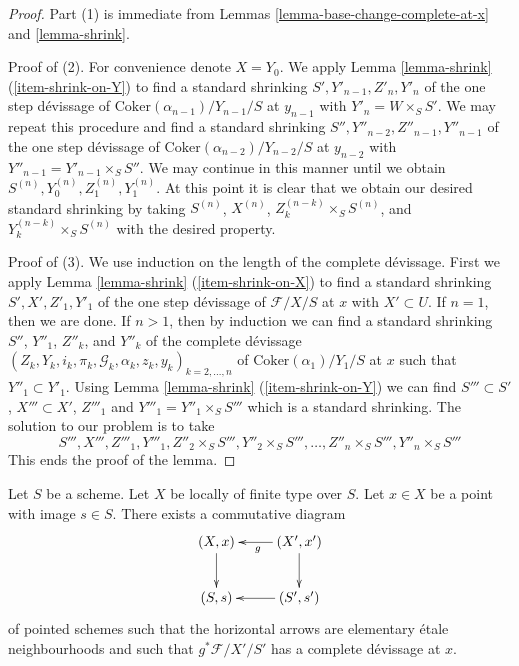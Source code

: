 \begin{proof}
Part (1) is immediate from
Lemmas \ref{lemma-base-change-complete-at-x} and
\ref{lemma-shrink}.

\medskip\noindent
Proof of (2). For convenience denote $X = Y_0$. We apply
Lemma \ref{lemma-shrink} (\ref{item-shrink-on-Y})
to find a standard shrinking
$S', Y'_{n - 1}, Z'_n, Y'_n$
of the one step d\'evissage of $\text{Coker}(\alpha_{n - 1})/Y_{n - 1}/S$
at $y_{n - 1}$ with $Y'_n = W \times_S S'$. We may repeat this procedure
and find a standard shrinking
$S'', Y''_{n - 2}, Z''_{n - 1}, Y''_{n - 1}$
of the one step d\'evissage of $\text{Coker}(\alpha_{n - 2})/Y_{n - 2}/S$
at $y_{n - 2}$ with $Y''_{n - 1} = Y'_{n - 1} \times_S S''$.
We may continue in this manner until we obtain
$S^{(n)}, Y^{(n)}_0, Z^{(n)}_1, Y^{(n)}_1$.
At this point it is clear that we obtain our desired standard shrinking
by taking $S^{(n)}$, $X^{(n)}$, $Z_k^{(n - k)} \times_S S^{(n)}$, and
$Y_k^{(n - k)} \times_S S^{(n)}$ with the desired property.

\medskip\noindent
Proof of (3). We use induction on the length of the complete
d\'evissage. First we apply
Lemma \ref{lemma-shrink} (\ref{item-shrink-on-X})
to find a standard shrinking
$S', X', Z'_1, Y'_1$ 
of the one step d\'evissage of $\mathcal{F}/X/S$ at $x$
with $X' \subset U$. If $n = 1$, then we are done.
If $n > 1$, then by induction we can find a standard shrinking
$S''$, $Y''_1$, $Z''_k$, and $Y''_k$ of the complete d\'evissage
$(Z_k, Y_k, i_k, \pi_k, \mathcal{G}_k, \alpha_k, z_k, y_k)_{k = 2, \ldots, n}$
of $\text{Coker}(\alpha_1)/Y_1/S$ at $x$ such that
$Y''_1 \subset Y'_1$. Using
Lemma \ref{lemma-shrink} (\ref{item-shrink-on-Y})
we can find $S''' \subset S'$, $X''' \subset X'$, $Z'''_1$ and
$Y'''_1 = Y''_1 \times_S S'''$ which is a standard shrinking.
The solution to our problem is to take
$$
S''', X''', Z'''_1, Y'''_1, Z''_2 \times_S S''',
Y''_2 \times_S S''', \ldots, Z''_n \times_S S''', Y''_n \times_S S'''
$$
This ends the proof of the lemma.
\end{proof}

\begin{proposition}
\label{proposition-existence-complete-at-x}
Let $S$ be a scheme.
Let $X$ be locally of finite type over $S$.
Let $x \in X$ be a point with image $s \in S$.
There exists a commutative diagram
$$
\xymatrix{
(X, x) \ar[d] & (X', x') \ar[l]^g \ar[d] \\
(S, s) & (S', s') \ar[l]
}
$$
of pointed schemes such that the horizontal
arrows are elementary \'etale neighbourhoods
and such that $g^*\mathcal{F}/X'/S'$ has a complete
d\'evissage at $x$.
\end{proposition}

